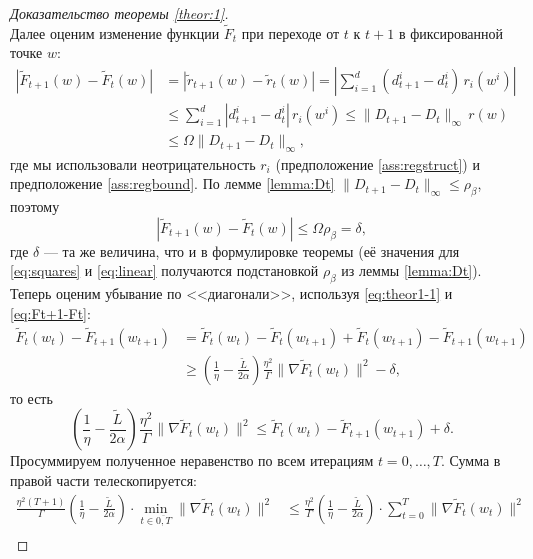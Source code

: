 \begin{proof}[Доказательство теоремы \ref{theor:1}]
\begin{equation}
\end{equation}
Далее оценим изменение функции $\widetilde{F}_t$ при переходе от $t$ к $t+1$ в фиксированной точке $w$:
\begin{equation*}
\begin{aligned}
    | \widetilde{F}_{t+1}(w) - \widetilde{F}_{t}(w)| &= |\widetilde{r}_{t+1}(w) - \widetilde{r}_t(w) | = \left|\sum\limits_{i=1}^d (d_{t+1}^i - d^i_t)\,r_i(w^i) \right| \\
    &\leq \sum\limits_{i=1}^d |d_{t+1}^i - d^i_t| \, r_i(w^i) \leq \|D_{t+1} - D_t\|_\infty \, r(w) \\
    &\leq \Omega \|D_{t+1} - D_t\|_\infty,
\end{aligned}
\end{equation*}
где мы использовали неотрицательность $r_i$ (предположение \ref{ass:regstruct}) и предположение \ref{ass:regbound}.
По лемме \ref{lemma:Dt} $\|D_{t+1} - D_t\|_\infty \le \rho_\beta$, поэтому
\begin{equation}
\label{eq:Ft+1-Ft}
| \widetilde{F}_{t+1}(w) - \widetilde{F}_{t}(w)| \le \Omega \rho_\beta = \delta,
\end{equation}
где $\delta$ --- та же величина, что и в формулировке теоремы (её значения для \eqref{eq:squares} и \eqref{eq:linear} получаются подстановкой $\rho_\beta$ из леммы \ref{lemma:Dt}).
Теперь оценим убывание по <<диагонали>>, используя \eqref{eq:theor1-1} и \eqref{eq:Ft+1-Ft}:
\begin{equation*}
\begin{aligned}
\widetilde{F}_t(w_t) - \widetilde{F}_{t+1}(w_{t+1}) &= \widetilde{F}_t(w_t) - \widetilde{F}_{t}(w_{t+1}) + \widetilde{F}_{t}(w_{t+1}) - \widetilde{F}_{t+1}(w_{t+1}) \\
&\ge \left(\frac{1}{\eta} - \frac{\widetilde{L}}{2\alpha}   \right) \frac{\eta^2}{\Gamma} \| \nabla\widetilde{F}_t(w_t) \|^2 - \delta,
\end{aligned}
\end{equation*}
то есть
\begin{equation*}
 \left(\frac{1}{\eta} - \frac{\widetilde{L}}{2\alpha}   \right) \frac{\eta^2}{\Gamma} \| \nabla\widetilde{F}_t(w_t) \|^2 \le \widetilde{F}_t(w_t) - \widetilde{F}_{t+1}(w_{t+1}) + \delta.
\end{equation*}
Просуммируем полученное неравенство по всем итерациям $t = 0, \ldots, T$. Сумма в правой части телескопируется:
\begin{equation*}
\begin{split}
    \frac{\eta^2  (T+1)}{\Gamma}\left(\frac{1}{\eta} - \frac{\widetilde{L}}{2\alpha}   \right)\cdot\min_{t \in \overline{0, T}} \|\nabla\widetilde{F}_t(w_t)\|^2 & \leq \frac{\eta^2}{\Gamma}\left(\frac{1}{\eta} - \frac{\widetilde{L}}{2\alpha}   \right)\cdot\sum\limits_{t = 0}^T \|\nabla\widetilde{F}_t(w_t)\|^2 \\

\end{split}
\end{equation*}
\end{proof}
